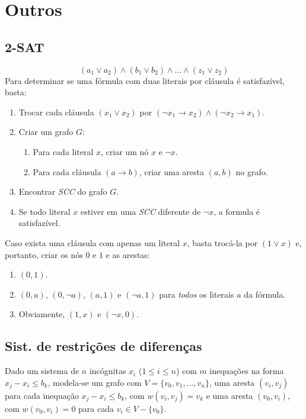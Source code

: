 \documentclass[12pt,a4paper]{article}
\begin{document}
	\section{Outros}
		\subsection{2-SAT}
			\[ (a_1 \vee a_2) \wedge (b_1 \vee b_2) \wedge \ldots \wedge (z_1 \vee z_2) \]
			Para determinar se uma fórmula com duas literais por cláusula é satisfazível, basta:
			\begin{enumerate}
				\item Trocar cada cláusula $ (x_1 \vee x_2) $ por $ (\neg x_1 \rightarrow x_2) \wedge (\neg x_2 \rightarrow x_1) $.
				\item Criar um grafo $G$:
				\begin{enumerate}
					\item Para cada literal $x$, criar um nó $x$ e $\neg x$.
					\item Para cada cláusula $ (a \rightarrow b) $, criar uma aresta $(a, b)$ no grafo.
				\end{enumerate}
				\item Encontrar \emph{SCC} do grafo $G$.
				\item Se todo literal $x$ estiver em uma \emph{SCC} diferente de $\neg x$, a formula é satisfazível.
			\end{enumerate}
			Caso exista uma cláusula com apenas um literal $x$, basta trocá-la por $(1 \vee x)$ e, portanto, criar os nós $0$ e $1$ e as arestas:
			\begin{enumerate}
				\item $(0, 1)$.
				\item $(0, a)$, $(0, \neg a)$, $(a, 1)$ e $(\neg a, 1)$ para \emph{todos} os literais $a$ da fórmula.
				\item Obviamente, $(1, x)$ e $(\neg x, 0)$.
			\end{enumerate}
		\subsection{Sist. de restrições de diferenças}
			Dado um sistema de $n$ incógnitas $x_i$ ($1 \leq i \leq n$) com $m$ inequações na forma $ x_j - x_i \leq b_k $, modela-se um grafo com $V = \{v_0, v_1, \ldots, v_n\} $, uma aresta $(v_i, v_j)$ para cada inequação $x_j - x_i \leq b_k$, com $w(v_i, v_j) = v_k$ e uma aresta $(v_0, v_i)$, com $w(v_0, v_i) = 0$ para cada $v_i \in V - \{v_0\}$.
			
\end{document}
